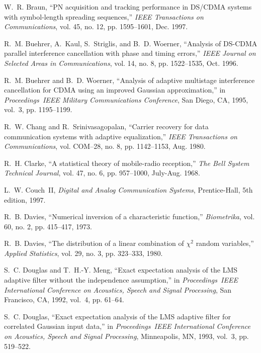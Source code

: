 \begin{thebibliography}{100}
W.~R. Braun,
\newblock ``{PN} acquisition and tracking performance in {DS/CDMA} systems with
  symbol-length spreading sequences,''
\newblock \emph{IEEE Transactions on Communications}, vol. 45, no. 12, pp.
  1595--1601, Dec. 1997.

R.~M. Buehrer, A.~Kaul, S.~Striglis, and B.~D. Woerner,
\newblock ``Analysis of {DS-CDMA} parallel interference cancellation with phase
  and timing errors,''
\newblock \emph{IEEE Journal on Selected Areas in Communications}, vol. 14, no.
  8, pp. 1522--1535, Oct. 1996.

R.~M. Buehrer and B.~D. Woerner,
\newblock ``Analysis of adaptive multistage interference cancellation for
  {CDMA} using an improved {Gaussian} approximation,''
\newblock in \emph{Proceedings~IEEE Military Communications Conference}, San
  Diego, CA, 1995, vol.~3, pp. 1195--1199.

R.~W. Chang and R.~Srinivasagopalan,
\newblock ``Carrier recovery for data communication systems with adaptive
  equalization,''
\newblock \emph{IEEE Transactions on Communications}, vol. COM--28, no. 8, pp.
  1142--1153, Aug. 1980.

R.~H. Clarke,
\newblock ``A statistical theory of mobile-radio reception,''
\newblock \emph{The Bell System Technical Journal}, vol. 47, no. 6, pp.
  957--1000, July-Aug. 1968.

L.~W. Couch~II,
\newblock \emph{Digital and Analog Communication Systems},
\newblock Prentice-Hall, 5th edition, 1997.

R.~B. Davies,
\newblock ``Numerical inversion of a characteristic function,''
\newblock \emph{Biometrika}, vol. 60, no. 2, pp. 415--417, 1973.

R.~B. Davies,
\newblock ``The distribution of a linear combination of $\chi^2$ random
  variables,''
\newblock \emph{Applied Statistics}, vol. 29, no. 3, pp. 323--333, 1980.

S.~C. Douglas and T.~H.-Y. Meng,
\newblock ``Exact expectation analysis of the {LMS} adaptive filter without the
  independence assumption,''
\newblock in \emph{Proceedings~IEEE International Conference on Acoustics,
  Speech and Signal Processing}, San Francisco, CA, 1992, vol.~4, pp. 61--64.

S.~C. Douglas,
\newblock ``Exact expectation analysis of the {LMS} adaptive filter for
  correlated {Gaussian} input data,''
\newblock in \emph{Proceedings~IEEE International Conference on Acoustics,
  Speech and Signal Processing}, Minneapolis, MN, 1993, vol.~3, pp. 519--522.

\end{thebibliography}
